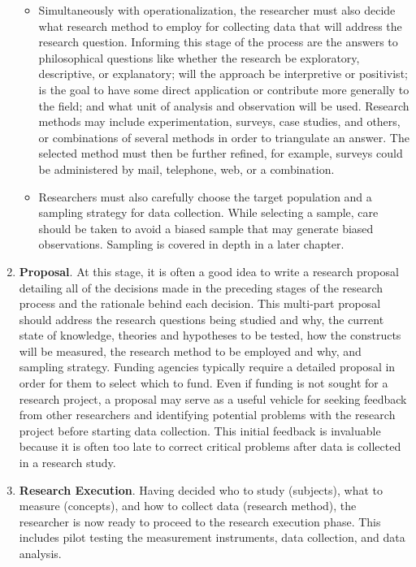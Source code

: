 \begin{enumerate}
\begin{itemize}
	\item Simultaneously with operationalization, the researcher must also decide what research method to employ for collecting data that will address the research question. Informing this stage of the process are the answers to philosophical questions like whether the research be exploratory, descriptive, or explanatory; will the approach be interpretive or positivist; is the goal to have some direct application or contribute more generally to the field; and what unit of analysis and observation will be used. Research methods may include experimentation, surveys, case studies, and others, or combinations of several methods in order to triangulate an answer. The selected method must then be further refined, for example, surveys could be administered by mail, telephone, web, or a combination.
	
	\item Researchers must also carefully choose the target population and a sampling strategy for data collection. While selecting a sample, care should be taken to avoid a biased sample that may generate biased observations. Sampling is covered in depth in a later chapter.
	
\end{itemize}

\item \textbf{Proposal}. At this stage, it is often a good idea to write a research proposal detailing all of the decisions made in the preceding stages of the research process and the rationale behind each decision. This multi-part proposal should address the research questions being studied and why, the current state of knowledge, theories and hypotheses to be tested, how the constructs will be measured, the research method to be employed and why, and sampling strategy. Funding agencies typically require a detailed proposal in order for them to select which to fund. Even if funding is not sought for a research project, a proposal may serve as a useful vehicle for seeking feedback from other researchers and identifying potential problems with the research project before starting data collection. This initial feedback is invaluable because it is often too late to correct critical problems after data is collected in a research study.

\item \textbf{Research Execution}. Having decided who to study (subjects), what to measure (concepts), and how to collect data (research method), the researcher is now ready to proceed to the research execution phase. This includes pilot testing the measurement instruments, data collection, and data analysis.


\end{enumerate}
